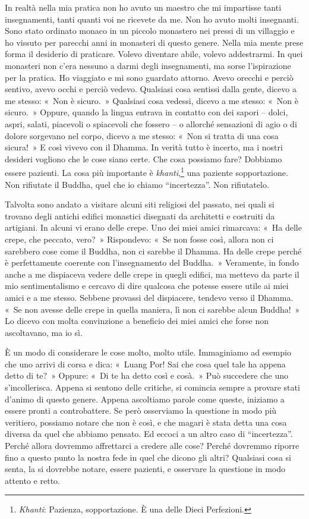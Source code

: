 In realtà nella mia pratica non ho avuto un maestro che mi impartisse
tanti insegnamenti, tanti quanti voi ne ricevete da me. Non ho avuto
molti insegnanti. Sono stato ordinato monaco in un piccolo monastero nei
pressi di un villaggio e ho vissuto per parecchi anni in monasteri di
questo genere. Nella mia mente prese forma il desiderio di praticare.
Volevo diventare abile, volevo addestrarmi. In quei monasteri non c'era
nessuno a darmi degli insegnamenti, ma sorse l'ispirazione per la
pratica. Ho viaggiato e mi sono guardato attorno. Avevo orecchi e perciò
sentivo, avevo occhi e perciò vedevo. Qualsiasi cosa sentissi dalla
gente, dicevo a me stesso: «~Non è sicuro.~» Qualsiasi cosa vedessi,
dicevo a me stesso: «~Non è sicuro.~» Oppure, quando la lingua entrava
in contatto con dei sapori -- dolci, aspri, salati, piacevoli o
spiacevoli che fossero -- o allorché sensazioni di agio o di dolore
sorgevano nel corpo, dicevo a me stesso: «~Non si tratta di una cosa
sicura!~» E così vivevo con il Dhamma. In verità tutto è incerto, ma i
nostri desideri vogliono che le cose siano certe. Che cosa possiamo
fare? Dobbiamo essere pazienti. La cosa più importante è
\emph{khanti},\footnote{\emph{Khanti}: Pazienza, sopportazione. È una
  delle Dieci Perfezioni.} una paziente sopportazione. Non rifiutate il
Buddha, quel che io chiamo ``incertezza''. Non rifiutatelo.

Talvolta sono andato a visitare alcuni siti religiosi del passato, nei
quali si trovano degli antichi edifici monastici disegnati da architetti
e costruiti da artigiani. In alcuni vi erano delle crepe. Uno dei miei
amici rimarcava: «~Ha delle crepe, che peccato, vero?~» Rispondevo: «~Se
non fosse così, allora non ci sarebbero cose come il Buddha, non ci
sarebbe il Dhamma. Ha delle crepe perché è perfettamente coerente con
l'insegnamento del Buddha.~» Veramente, in fondo anche a me dispiaceva
vedere delle crepe in quegli edifici, ma mettevo da parte il mio
sentimentalismo e cercavo di dire qualcosa che potesse essere utile ai
miei amici e a me stesso. Sebbene provassi del dispiacere, tendevo verso
il Dhamma. «~Se non avesse delle crepe in quella maniera, lì non ci
sarebbe alcun Buddha!~» Lo dicevo con molta convinzione a beneficio dei
miei amici che forse non ascoltavano, ma io sì.

È un modo di considerare le cose molto, molto utile. Immaginiamo ad
esempio che uno arrivi di corsa e dica: «~Luang Por! Sai che cosa quel
tale ha appena detto di te?~» Oppure: «~Di te ha detto così e cosà.~»
Può succedere che uno s'incollerisca. Appena si sentono delle critiche,
si comincia sempre a provare stati d'animo di questo genere. Appena
ascoltiamo parole come queste, iniziamo a essere pronti a controbattere.
Se però osserviamo la questione in modo più veritiero, possiamo notare
che non è così, e che magari è stata detta una cosa diversa da quel che
abbiamo pensato. Ed eccoci a un altro caso di ``incertezza''. Perché
allora dovremmo affrettarci a credere alle cose? Perché dovremmo riporre
fino a questo punto la nostra fede in quel che dicono gli altri?
Qualsiasi cosa si senta, la si dovrebbe notare, essere pazienti, e
osservare la questione in modo attento e retto.

